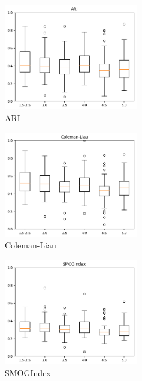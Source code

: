 \documentclass[12pt,journal,compsoc]{IEEEtran}
\begin{document}
\begin{center}
\begin{minipage}{\linewidth}
  \begin{minipage}{0.25\linewidth}
      \begin{figure}[H]
          \includegraphics[width=2.3in]{../unigrams/scripts/boxplots/ARI.png}
          \caption{ARI}
      \end{figure}
  \end{minipage}
  \hspace{0.05\linewidth}
  \begin{minipage}{0.25\linewidth}
      \begin{figure}[H]
          \includegraphics[width=2.3in]{../unigrams/scripts/boxplots/Coleman-Liau.png}
          \caption{Coleman-Liau}
      \end{figure}
  \end{minipage}
  \hspace{0.05\linewidth}
  \begin{minipage}{0.25\linewidth}
      \begin{figure}[H]
          \includegraphics[width=2.3in]{../unigrams/scripts/boxplots/SMOGIndex.png}
          \caption{SMOGIndex}
      \end{figure}
  \end{minipage}
\end{minipage}


\end{center}
\end{document}
